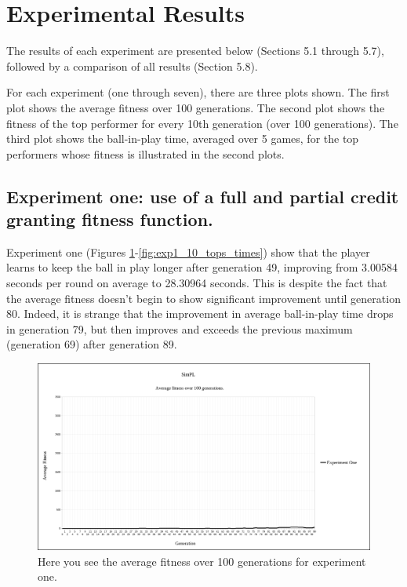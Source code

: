 \documentclass[a4paper,10pt]{article}
\begin{document}
\section{Experimental Results}

The results of each experiment are presented below (Sections 5.1 through 5.7), followed by a comparison of all results (Section 5.8).

For each experiment (one through seven), there are three plots shown. The first plot shows the average fitness over 100 generations. The second plot shows the fitness of the top performer for every 10th generation (over 100 generations). The third plot shows the ball-in-play time, averaged over 5 games, for the top performers whose fitness is illustrated in the second plots.

\subsection{Experiment one: use of a full and partial credit granting fitness function.}

Experiment one (Figures \ref{fig:exp1_avg_fit}-\ref{fig:exp1_10_tops_times}) show that the player learns to keep the ball in play longer after generation 49, improving from 3.00584 seconds per round on average to 28.30964 seconds. This is despite the fact that the average fitness doesn't begin to show significant improvement until generation 80. Indeed, it is strange that the improvement in average ball-in-play time drops in generation 79, but then improves and exceeds the previous maximum (generation 69) after generation 89.

\begin{figure}[H]  
  \centering
  \includegraphics[width=1\textwidth]{figures/exp1_avg_fit.png}
  \caption{Here you see the average fitness over 100 generations for experiment one.}
  \label{fig:exp1_avg_fit}
\end{figure}
\end{document}
